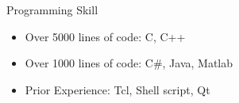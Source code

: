 \documentclass{resume}
\begin{document}
\begin{rSection}{Programming Skill}
\renewcommand\labelitemi{$\cdot$}
\begin{itemize}[leftmargin=0em]
  \item Over 5000 lines of code: C, C++
  \item Over 1000 lines of code: C\#, Java, Matlab
  \item Prior Experience: Tcl, Shell script, Qt
\end{itemize}


\end{rSection}

\end{document}
